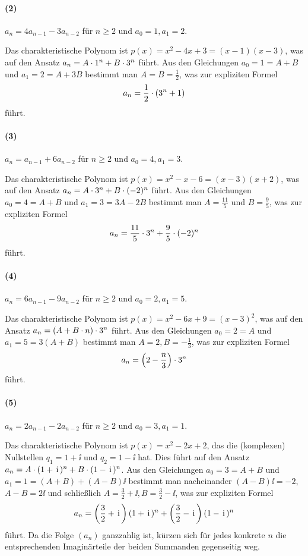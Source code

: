 \documentclass[11pt,a4paper]{article}
\begin{document}
\paragraph{(2)}
$a_n=4a_{n-1}-3a_{n-2}$ für $n\ge 2$ und $a_0=1, a_1=2$.

Das charakteristische Polynom ist $p(x)=x^2-4x+3=(x-1)(x-3)$, was auf den
Ansatz $a_n=A\cdot 1^n+B\cdot 3^n$ führt. Aus den Gleichungen $a_0=1=A+B$ und
$a_1=2=A+3B$ bestimmt man $A=B=\frac12$, was zur expliziten Formel
\begin{gather*}
  a_n=\frac12\cdot\left(3^n+1\right)
\end{gather*}
führt.

\paragraph{(3)}
$a_n=a_{n-1}+6a_{n-2}$ für $n\ge 2$ und $a_0=4, a_1=3$.

Das charakteristische Polynom ist $p(x)=x^2-x-6=(x-3)(x+2)$, was auf den Ansatz
$a_n=A\cdot 3^n+B\cdot (-2)^n$ führt. Aus den Gleichungen $a_0=4=A+B$ und
$a_1=3=3A-2B$ bestimmt man $A=\frac{11}{5}$ und $B=\frac95$, was zur expliziten
Formel
\begin{gather*}
  a_n=\frac{11}{5}\cdot 3^n+\frac95\cdot (-2)^n
\end{gather*}
führt.

\paragraph{(4)}
$a_n=6a_{n-1}-9a_{n-2}$ für $n\ge 2$ und $a_0=2, a_1=5$.

Das charakteristische Polynom ist $p(x)=x^2-6x+9=(x-3)^2$, was auf den Ansatz
$a_n=(A+B\cdot n)\cdot 3^n$ führt. Aus den Gleichungen $a_0=2=A$ und $a_1=5=3(A+B)$
bestimmt man $A=2, B=-\frac13$, was zur expliziten Formel
\begin{gather*}
  a_n=\left(2-\frac{n}{3}\right)\cdot 3^n
\end{gather*}
führt.

\paragraph{(5)}
$a_n=2a_{n-1}-2a_{n-2}$ für $n\ge 2$ und $a_0=3, a_1=1$.

Das charakteristische Polynom ist $p(x)=x^2-2x+2$, das die (komplexen)
Nullstellen $q_1=1+\ii$ und $q_2=1-\ii$ hat. Dies führt auf den Ansatz
$a_n=A\cdot(1+\,\mathrm{i}\,)^n+B\cdot(1-\,\mathrm{i}\,)^n$. Aus den Gleichungen $a_0=3=A+B$ und
$a_1=1=(A+B)+(A-B)\ii$ bestimmt man nacheinander $(A-B)\ii=-2$, $A-B=2\ii$ und
schließlich $A=\frac32+\ii, B=\frac32-\ii$, was zur expliziten Formel
\begin{gather*}
  a_n=\left(\frac32+\,\mathrm{i}\,\right)(1+\,\mathrm{i}\,)^n+\left(\frac32-\,\mathrm{i}\,\right)(1-\,\mathrm{i}\,)^n
\end{gather*}
führt.  Da die Folge $(a_n)$ ganzzahlig ist, kürzen sich für jedes konkrete
$n$ die entsprechenden Imaginärteile der beiden Summanden gegenseitig weg.
\end{document}

